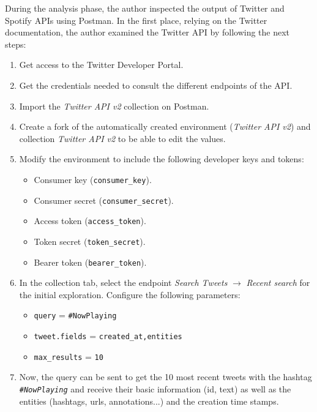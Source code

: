 \nonzeroparskip During the analysis phase, the author inspected the output of Twitter and Spotify APIs using Postman. In the first place, relying on the Twitter documentation, the author examined the Twitter API by following the next steps:
\begin{enumerate}
	\item Get access to the Twitter Developer Portal.
	\item Get the credentials needed to consult the different endpoints of the API.
	\item Import the \textit{Twitter API v2} collection on Postman.
	\item Create a fork of the automatically created environment (\textit{Twitter API v2}) and collection \textit{Twitter API v2} to be able to edit the values.
	\item Modify the environment to include the following developer keys and tokens:
	\begin{itemize}
		\item Consumer key (\texttt{consumer\_key}).
		\item Consumer secret (\texttt{consumer\_secret}).
		\item Access token (\texttt{access\_token}).
		\item Token secret (\texttt{token\_secret}).
		\item Bearer token (\texttt{bearer\_token}).
	\end{itemize}
	\item In the collection tab, select the endpoint \textit{Search Tweets} $\longrightarrow$ \textit{Recent search} for the initial exploration. Configure the following parameters:
	\begin{itemize}
		\item \texttt{query} = \texttt{\#NowPlaying}
		\item \texttt{tweet.fields} = \texttt{created\_at,entities}
		\item \texttt{max\_results} = \texttt{10}
	\end{itemize}
	\item Now, the query can be sent  to get the 10 most recent tweets with the hashtag \texttt{\textit{\#NowPlaying}} and receive their basic information (id, text) as well as the entities (hashtags, urls, annotations...) and the creation time stamps.
\end{enumerate}

